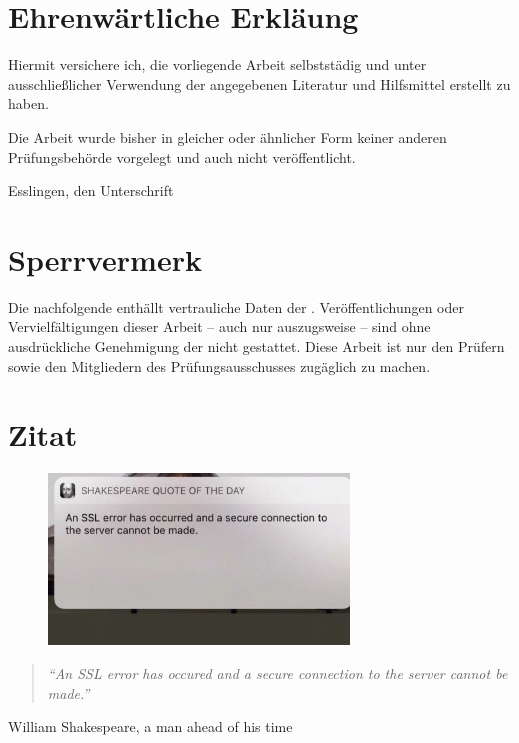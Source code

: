 \chapter*{Ehrenwärtliche Erkläung}

Hiermit versichere ich, die vorliegende Arbeit selbststädig und unter ausschließlicher Verwendung der angegebenen Literatur und Hilfsmittel erstellt zu haben.

Die Arbeit wurde bisher in gleicher oder ähnlicher Form keiner anderen Prüfungsbehörde vorgelegt und auch nicht veröffentlicht.

\hrulefill

Esslingen, den \workDate \hspace*{\fill} Unterschrift


\newpage
%
\chapter*{Sperrvermerk} %

Die nachfolgende \workType  enthällt vertrauliche Daten der \workComany.
Veröffentlichungen oder Vervielfältigungen dieser Arbeit -- auch nur auszugsweise -- sind ohne ausdrückliche Genehmigung der \workComany  nicht gestattet.
Diese Arbeit ist nur den Prüfern sowie den Mitgliedern des Prüfungsausschusses zugäglich zu machen.
\newpage
%
\chapter*{Zitat} %
\begin{center}
\begin{figure}[ht]
  \centering
  \includegraphics[width=8cm]{assets/shakespeare.jpeg}
\end{figure}

\begin{minipage}{12cm}
\begin{quotation}
\textit{\enquote{An SSL error has occured and a secure connection to the server cannot be made.}}
\end{quotation}
\hfill \textsf William Shakespeare, a man ahead of his time
\end{minipage}
\end{center}
\newpage{}
%
